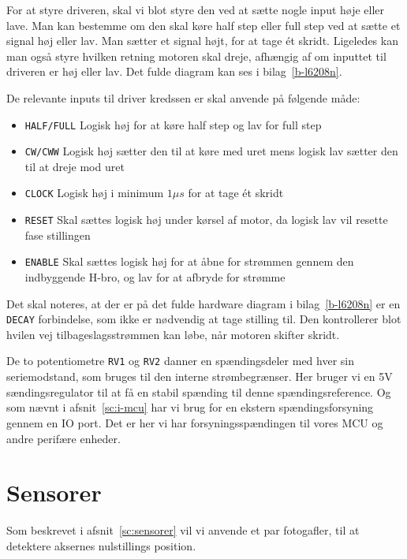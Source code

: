 For at styre driveren, skal vi blot styre den ved at sætte nogle input
høje eller lave. Man kan bestemme om den skal køre half step eller
full step ved at sætte et signal høj eller lav. Man sætter et signal
højt, for at tage ét skridt. Ligeledes kan man også styre hvilken
retning motoren skal dreje, afhængig af om inputtet til driveren er
høj eller lav. Det fulde diagram kan ses i bilag~\vref{b-l6208n}.

De relevante inputs til driver kredssen er skal anvende på følgende måde:

\begin{itemize} \firmlist
\item \texttt{HALF/FULL} Logisk høj for at køre half step
  og lav for full step
\item \texttt{CW/CWW} Logisk høj sætter den til at køre med uret mens
  logisk lav sætter den til at dreje mod uret
\item \texttt{CLOCK} Logisk høj i minimum $1\mu s$ for at tage ét skridt
\item \texttt{RESET} Skal sættes logisk høj under kørsel af motor, da
  logisk lav vil resette fase stillingen
\item \texttt{ENABLE} Skal sættes logisk høj for at åbne for strømmen
  gennem den indbyggende H-bro, og lav for at afbryde for strømme
\end{itemize}

Det skal noteres, at der er på det fulde hardware diagram i
bilag~\vref{b-l6208n} er en \texttt{DECAY} forbindelse, som ikke er
nødvendig at tage stilling til. Den kontrollerer blot hvilen vej
tilbageslagsstrømmen kan løbe, når motoren skifter skridt.

De to potentiometre \texttt{RV1} og \texttt{RV2} danner en
spændingsdeler med hver sin seriemodstand, som bruges til den interne
strømbegrænser. Her bruger vi en 5V sændingsregulator til at få en
stabil spænding til denne spændingsreference. Og som nævnt i
afsnit~\vref{sc:i-mcu} har vi brug for en ekstern spændingsforsyning
gennem en IO port. Det er her vi har forsyningsspændingen til vores
MCU og andre perifære enheder.

\section{Sensorer}
Som beskrevet i afsnit~\vref{sc:sensorer} vil vi anvende et par
fotogafler, til at detektere aksernes nulstillings position.


